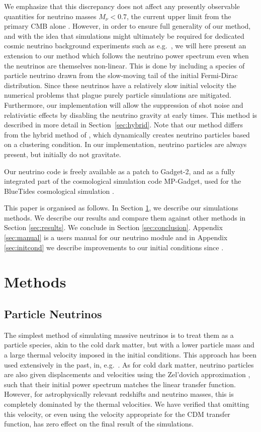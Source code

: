 \documentclass[useAMS, usenatbib]{mnras}
\begin{document}
We emphasize that this discrepancy does not affect any presently observable quantities for neutrino masses $M_\nu < 0.7$, the current upper limit from the primary CMB alone \cite{Planck_2015}. However, in order to ensure full generality of our method, and with the idea that simulations might ultimately be required for dedicated cosmic neutrino background experiments such as e.g.~\citep{Ptolemy}, we will here present an extension to our method which follows the neutrino power spectrum even when the neutrinos are themselves non-linear. This is done by including a species of particle neutrino drawn from the slow-moving tail of the initial Fermi-Dirac distribution. Since these neutrinos have a relatively slow initial velocity the numerical problems that plague purely particle simulations are mitigated.
Furthermore, our implementation will allow the suppression of shot noise and relativistic effects by disabling the neutrino gravity at early times. This method is described in more detail in Section~\ref{sec:hybrid}. Note that our method differs from the hybrid method of \cite{Brandbyge_2010}, which dynamically creates neutrino particles based on a clustering condition. In our implementation, neutrino particles are always present, but initially do not gravitate.

Our neutrino code is freely available as a patch to Gadget-2, and as a fully integrated part of the cosmological simulation code MP-Gadget, used for the BlueTides cosmological simulation \cite{Feng_2016}.

This paper is organised as follows. In Section \ref{sec:methods}, we describe our simulations methods. We describe our
results and compare them against other methods in Section \ref{sec:results}. We conclude in Section \ref{sec:conclusion}. Appendix \ref{sec:manual} is a users manual for our neutrino module and in Appendix \ref{sec:initcond} we describe improvements to our initial conditions since \cite{AHB}.

\section{Methods}
\label{sec:methods}

\subsection{Particle Neutrinos}
\label{sec:particle}

The simplest method of simulating massive neutrinos is to treat them as a particle species, akin to the cold dark matter, but with a lower particle mass and a large thermal velocity imposed in the initial conditions. This approach has been used extensively in the past, in, e.g.~\citep{Brandbyge_2008, Bird_2012}. As for cold dark matter, neutrino particles are also given displacements and velocities using the Zel'dovich approximation \citep{Zeldovich_1970}, such that their initial power spectrum matches the linear transfer function. However, for astrophysically relevant redshifts and neutrino masses, this is completely dominated by the thermal velocities. We have verified that omitting this velocity, or even using the velocity appropriate for the CDM transfer function, has zero effect on the final result of the simulations.
\end{document}
